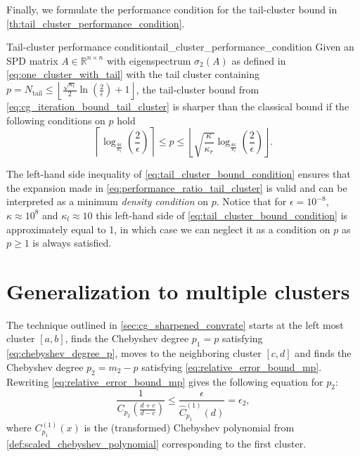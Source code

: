 Finally, we formulate the performance condition for the tail-cluster bound in \cref{th:tail_cluster_performance_condition}.
\begin{fancyth}{Tail-cluster performance condition}{tail_cluster_performance_condition}
    Given an SPD matrix $A \in \mathbb{R}^{n \times n}$ with eigenspectrum $\sigma_2(A)$ as defined in \cref{eq:one_cluster_with_tail} with the tail cluster containing $p=N_{\text{tail}} \leq \left\lfloor\frac{\sqrt{\kappa_l}}{2}\ln\left(\frac{2}{\epsilon}\right) + 1 \right\rfloor$, the tail-cluster bound from \cref{eq:cg_iteration_bound_tail_cluster} is sharper than the classical bound if the following conditions on $p$ hold
    \begin{equation}
        \left\lceil\log_{\frac{4\kappa}{\kappa_l}}\left(\frac{2}{\epsilon}\right)\right\rceil \leq p \leq \left\lfloor\sqrt{\frac{\kappa}{\kappa_r}}\log_{\frac{4\kappa}{\kappa_l}}\left(\frac{2}{\epsilon}\right)\right\rfloor.
        \label{eq:tail_cluster_bound_condition}
    \end{equation}
\end{fancyth}
The left-hand side inequality of \cref{eq:tail_cluster_bound_condition} ensures that the expansion made in \cref{eq:performance_ratio_tail_cluster} is valid and can be interpreted as a minimum \textit{density condition} on $p$. Notice that for $\epsilon = 10^{-8}$, $\kappa\approx 10^{8}$ and $\kappa_l\approx 10$ this left-hand side of \cref{eq:tail_cluster_bound_condition} is approximately equal to 1, in which case we can neglect it as a condition on $p$ as $p\geq 1$ is always satisfied.

\section{Generalization to multiple clusters}\label{sec:multiple_clusters}
The technique outlined in \cref{sec:cg_sharpened_convrate} starts at the left most cluster $[a,b]$, finds the Chebyshev degree $p_1=p$ satisfying \cref{eq:chebyshev_degree_p}, moves to the neighboring cluster $[c,d]$ and finds the Chebyshev degree $p_2 = m_2 - p$ satisfying \cref{eq:relative_error_bound_mp}. Rewriting \cref{eq:relative_error_bound_mp} gives the following equation for $p_2$:
\begin{equation}
    \frac{1}{C_{p_2}\left(\frac{d+c}{d-c}\right)} \leq \frac{\epsilon}{\hat{C}^{(1)}_{p_1}(d)} = \epsilon_2,
    \label{eq:chebyshev_degree_p_prime}
\end{equation}
where $C^{(1)}_{p_1}(x)$ is the (transformed) Chebyshev polynomial from \cref{def:scaled_chebyshev_polynomial} corresponding to the first cluster.

